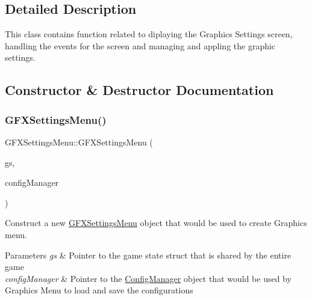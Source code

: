 \subsection{Detailed Description}
This class contains function related to diplaying the Graphics Settings screen, handling the events for the screen and managing and appling the graphic settings. 



\subsection{Constructor \& Destructor Documentation}
\mbox{\label{class_g_f_x_settings_menu_ac76b53d51d1f1c693684fb25653f6af1}} 
\subsubsection{\texorpdfstring{GFXSettingsMenu()}{GFXSettingsMenu()}}
{\footnotesize\ttfamily G\+F\+X\+Settings\+Menu\+::\+G\+F\+X\+Settings\+Menu (\begin{DoxyParamCaption}\item[{\mbox{\hyperlink{struct_game_state}{Game\+State}} $\ast$}]{gs,  }\item[{\mbox{\hyperlink{class_config_manager}{Config\+Manager}} $\ast$}]{config\+Manager }\end{DoxyParamCaption})}



Construct a new \mbox{\hyperlink{class_g_f_x_settings_menu}{G\+F\+X\+Settings\+Menu}} object that would be used to create Graphics menu. 


\begin{DoxyParams}{Parameters}
{\em gs} & Pointer to the game state struct that is shared by the entire game \\
\hline
{\em config\+Manager} & Pointer to the \mbox{\hyperlink{class_config_manager}{Config\+Manager}} object that would be used by Graphics Menu to load and save the configurations \\
\hline
\end{DoxyParams}
\mbox{\label{class_g_f_x_settings_menu_a59316167f08ca2dc6ca2ebfafec63e2f}} 

